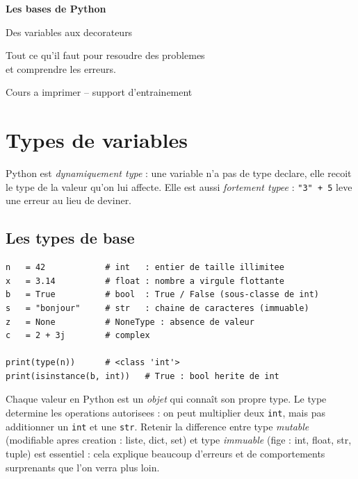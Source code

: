 \documentclass[11pt,a4paper]{article}
\begin{document}
\begin{titlepage}
\centering
\vspace*{3cm}
{\color{primary}\Huge\bfseries Les bases de Python\par}
\vspace{0.6cm}
{\color{accent}\LARGE Des variables aux decorateurs\par}
\vspace{1.2cm}
{\large Tout ce qu'il faut pour resoudre des problemes\\
et comprendre les erreurs.\par}
\vfill
{\color{codecom}\large Cours a imprimer -- support d'entrainement\par}
\vspace{2cm}
\end{titlepage}

\tableofcontents
\newpage

\section{Types de variables}
Python est \emph{dynamiquement type} : une variable n'a pas de type declare, elle
recoit le type de la valeur qu'on lui affecte. Elle est aussi \emph{fortement
typee} : \texttt{"3" + 5} leve une erreur au lieu de deviner.

\subsection{Les types de base}
\begin{lstlisting}
n   = 42            # int   : entier de taille illimitee
x   = 3.14          # float : nombre a virgule flottante
b   = True          # bool  : True / False (sous-classe de int)
s   = "bonjour"     # str   : chaine de caracteres (immuable)
z   = None          # NoneType : absence de valeur
c   = 2 + 3j        # complex

print(type(n))      # <class 'int'>
print(isinstance(b, int))   # True : bool herite de int
\end{lstlisting}

Chaque valeur en Python est un \emph{objet} qui connaît son propre type. Le type
determine les operations autorisees : on peut multiplier deux \texttt{int}, mais
pas additionner un \texttt{int} et une \texttt{str}. Retenir la difference entre
type \emph{mutable} (modifiable apres creation : liste, dict, set) et type
\emph{immuable} (fige : int, float, str, tuple) est essentiel : cela explique
beaucoup d'erreurs et de comportements surprenants que l'on verra plus loin.
\end{document}
